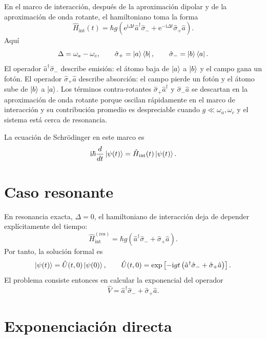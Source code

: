 \documentclass[11pt]{article}
\newcommand{\ii}{\mathrm{i}}
\newcommand{\ee}{\mathrm{e}}
\newcommand{\adag}{\hat a^\dagger}
\newcommand{\sigmap}{\hat\sigma_+}
\newcommand{\sigmam}{\hat\sigma_-}
\newcommand{\Hint}{\hat H_{\mathrm{int}}}
\begin{document}
En el marco de interacci\'on, despu\'es de la aproximaci\'on dipolar y de la
aproximaci\'on de onda rotante, el hamiltoniano toma la forma
\begin{equation}
  \boxed{
  \Hint(t)
  =
  \hbar g
  \left(
  \ee^{\ii\Delta t}\adag\sigmam
  +
  \ee^{-\ii\Delta t}\sigmap \hat a
  \right).
  }
\end{equation}
Aqu\'i
\begin{equation}
  \Delta=\omega_a-\omega_c,
  \qquad
  \sigmap=\ket{a}\bra{b},
  \qquad
  \sigmam=\ket{b}\bra{a}.
\end{equation}
El operador $\adag\sigmam$ describe emisi\'on: el \'atomo baja de
$\ket{a}$ a $\ket{b}$ y el campo gana un fot\'on. El operador
$\sigmap\hat a$ describe absorci\'on: el campo pierde un fot\'on y el \'atomo
sube de $\ket{b}$ a $\ket{a}$. Los t\'erminos contra-rotantes
$\sigmap\adag$ y $\sigmam\hat a$ se descartan en la aproximaci\'on de onda
rotante porque oscilan r\'apidamente en el marco de interacci\'on y su
contribuci\'on promedio es despreciable cuando $g\ll \omega_a,\omega_c$ y el
sistema est\'a cerca de resonancia.

La ecuaci\'on de Schr\"odinger en este marco es
\begin{equation}
  \ii\hbar\frac{d}{dt}\ket{\psi(t)}
  =
  \Hint(t)\ket{\psi(t)}.
\end{equation}

\section{Caso resonante}

En resonancia exacta, $\Delta=0$, el hamiltoniano de interacci\'on deja de
depender expl\'icitamente del tiempo:
\begin{equation}
  \Hint^{(\mathrm{res})}
  =
  \hbar g
  \left(\adag\sigmam+\sigmap\hat a\right).
\end{equation}
Por tanto, la soluci\'on formal es
\begin{equation}
  \ket{\psi(t)}
  =
  \hat U(t,0)\ket{\psi(0)},
  \qquad
  \hat U(t,0)
  =
  \exp\left[
  -\ii gt
  \left(\adag\sigmam+\sigmap\hat a\right)
  \right].
\end{equation}
El problema consiste entonces en calcular la exponencial del operador
\begin{equation}
  \hat V=\adag\sigmam+\sigmap\hat a.
\end{equation}

\section{Exponenciaci\'on directa}
\end{document}
